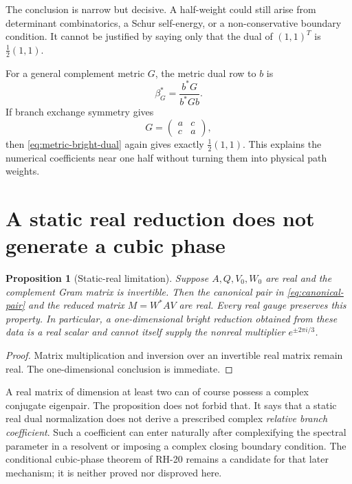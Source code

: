 \documentclass[11pt]{article}
\newtheorem{proposition}[theorem]{Proposition}
\theoremstyle{definition}
\theoremstyle{remark}
\begin{document}
The conclusion is narrow but decisive.  A half-weight could still arise
from determinant combinatorics, a Schur self-energy, or a non-conservative
boundary condition.  It cannot be justified by saying only that the dual of
$(1,1)^T$ is $\frac12(1,1)$.

For a general complement metric $G$, the metric dual row to $b$ is
\begin{equation}\label{eq:metric-bright-dual}
 \beta_G^*=\frac{b^*G}{b^*Gb}.
\end{equation}
If branch exchange symmetry gives
\begin{equation}\label{eq:exchange-metric}
 G=\begin{pmatrix}a&c\\c&a\end{pmatrix},
\end{equation}
then \eqref{eq:metric-bright-dual} again gives exactly
$\frac12(1,1)$.  This explains the numerical coefficients near one half
without turning them into physical path weights.

\section{A static real reduction does not generate a cubic phase}
\label{sec:realness}

\begin{proposition}[Static-real limitation]
\label{prop:realness}
Suppose $A,Q,V_0,W_0$ are real and the complement Gram matrix is invertible.
Then the canonical pair in \eqref{eq:canonical-pair} and the reduced matrix
$M=W^*AV$ are real.  Every real gauge preserves this property.  In
particular, a one-dimensional bright reduction obtained from these data is a
real scalar and cannot itself supply the nonreal multiplier
$e^{\pm2\pi i/3}$.
\end{proposition}

\begin{proof}
Matrix multiplication and inversion over an invertible real matrix remain
real.  The one-dimensional conclusion is immediate.
\end{proof}

A real matrix of dimension at least two can of course possess a complex
conjugate eigenpair.  The proposition does not forbid that.  It says that a
static real dual normalization does not derive a prescribed complex
\emph{relative branch coefficient}.  Such a coefficient can enter naturally
after complexifying the spectral parameter in a resolvent or imposing a
complex closing boundary condition.  The conditional cubic-phase theorem of
RH-20 remains a candidate for that later mechanism; it is neither proved nor
disproved here.
\end{document}
